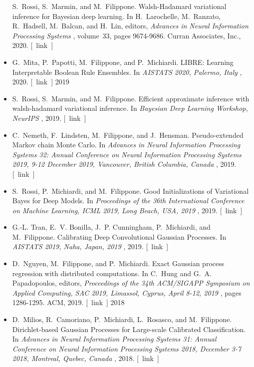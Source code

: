 \documentclass[10pt]{article}
\begin{document}
\begin{itemize}
  S. Rossi, S. Marmin, and M. Filippone. Walsh-Hadamard variational inference for Bayesian deep learning. In H. Larochelle, M. Ranzato, R. Hadsell, M. Balcan, and H. Lin, editors, \emph{Advances in Neural Information Processing Systems}
, volume 33, pages 9674-9686. Curran Associates, Inc., 2020. [ link ] 

\item 

  G. Mita, P. Papotti, M. Filippone, and P. Michiardi. LIBRE: Learning Interpretable Boolean Rule Ensembles. In \emph{AISTATS 2020, Palermo, Italy}
, 2020. [ link ] 
2019
\item 

  S. Rossi, S. Marmin, and M. Filippone. Efficient approximate inference with walsh-hadamard variational inference. In \emph{Bayesian Deep Learning Workshop, NeurIPS}
, 2019. [ link ] 

\item 

  C. Nemeth, F. Lindsten, M. Filippone, and J. Hensman. Pseudo-extended Markov chain Monte Carlo. In \emph{Advances in Neural Information Processing Systems 32: Annual Conference on Neural Information Processing Systems 2019, 9-12 December 2019, Vancouver, British Columbia, Canada}
, 2019. [ link ] 

\item 

  S. Rossi, P. Michiardi, and M. Filippone. Good Initializations of Variational Bayes for Deep Models. In \emph{Proceedings of the 36th International Conference on Machine Learning, ICML 2019, Long Beach, USA, 2019}
, 2019. [ link ] 

\item 

  G.-L. Tran, E. V. Bonilla, J. P. Cunningham, P. Michiardi, and M. Filippone. Calibrating Deep Convolutional Gaussian Processes. In \emph{AISTATS 2019, Naha, Japan, 2019}
, 2019. [ link ] 

\item 

  D. Nguyen, M. Filippone, and P. Michiardi. Exact Gaussian process regression with distributed computations. In C. Hung and G. A. Papadopoulos, editors, \emph{Proceedings of the 34th ACM/SIGAPP Symposium on Applied Computing, SAC 2019, Limassol, Cyprus, April 8-12, 2019}
, pages 1286-1295. ACM, 2019. [ link ] 
2018
\item 

  D. Milios, R. Camoriano, P. Michiardi, L. Rosasco, and M. Filippone. Dirichlet-based Gaussian Processes for Large-scale Calibrated Classification. In \emph{Advances in Neural Information Processing Systems 31: Annual Conference on Neural Information Processing Systems 2018, December 3-7 2018, Montreal, Quebec, Canada}
, 2018. [ link ] 


\end{itemize}
\end{document}
